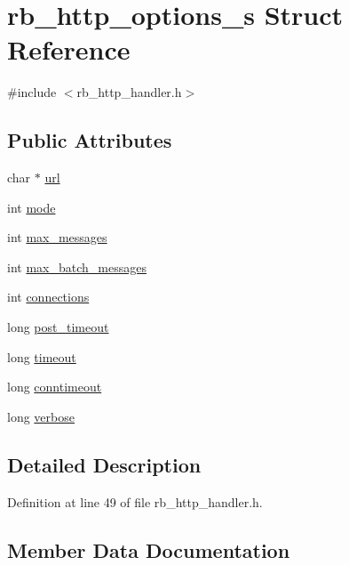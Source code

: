 \hypertarget{structrb__http__options__s}{}\section{rb\+\_\+http\+\_\+options\+\_\+s Struct Reference}
\label{structrb__http__options__s}


{\ttfamily \#include $<$rb\+\_\+http\+\_\+handler.\+h$>$}

\subsection*{Public Attributes}
\begin{DoxyCompactItemize}
\item 
char $\ast$ \hyperlink{structrb__http__options__s_a4ff0dbf74743aeea85f9c48ab51671cd}{url}
\item 
int \hyperlink{structrb__http__options__s_a64f2c587ef7670833a6edf4f41d633c4}{mode}
\item 
int \hyperlink{structrb__http__options__s_ac5ccee77d6e77acc3955c6f24208b418}{max\+\_\+messages}
\item 
int \hyperlink{structrb__http__options__s_ac536073f205a9b3da3b8e4996147ad12}{max\+\_\+batch\+\_\+messages}
\item 
int \hyperlink{structrb__http__options__s_a2538df47ad13074f7f3f2dc08896fd64}{connections}
\item 
long \hyperlink{structrb__http__options__s_ade609266d9b7af3df70993f8fa609ac3}{post\+\_\+timeout}
\item 
long \hyperlink{structrb__http__options__s_ad54577110b8dee7499f3c60a4355b0c0}{timeout}
\item 
long \hyperlink{structrb__http__options__s_a8e300262e7726f2d0d4c52b3eaacce57}{conntimeout}
\item 
long \hyperlink{structrb__http__options__s_adcb5506e74f7169825e080b19d1731a0}{verbose}
\end{DoxyCompactItemize}


\subsection{Detailed Description}


Definition at line 49 of file rb\+\_\+http\+\_\+handler.\+h.



\subsection{Member Data Documentation}
\hypertarget{structrb__http__options__s_a2538df47ad13074f7f3f2dc08896fd64}{}
